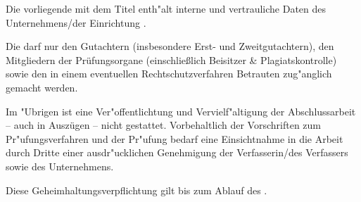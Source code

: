 Die vorliegende \art mit dem Titel \titel enth"alt interne und vertrauliche Daten des Unternehmens/der Einrichtung \unternehmen.

Die \art darf nur den Gutachtern (insbesondere Erst- und Zweitgutachtern), den Mitgliedern der Prüfungsorgane (einschlie{\ss}lich Beisitzer \& Plagiatskontrolle) sowie den in einem eventuellen Rechtschutzverfahren Betrauten zug"anglich gemacht werden.

Im "Ubrigen ist eine Ver"offentlichtung und Vervielf"altigung der Abschlussarbeit -- auch in Auszügen -- nicht gestattet. Vorbehaltlich der Vorschriften zum Pr"ufungsverfahren und der Pr"ufung bedarf eine Einsichtnahme in die Arbeit durch Dritte einer ausdr"ucklichen Genehmigung der Verfasserin/des Verfassers sowie des \oa Unternehmens.

Diese Geheimhaltungsverpflichtung gilt bis zum Ablauf des \datumAblaufSperrvermerk.
